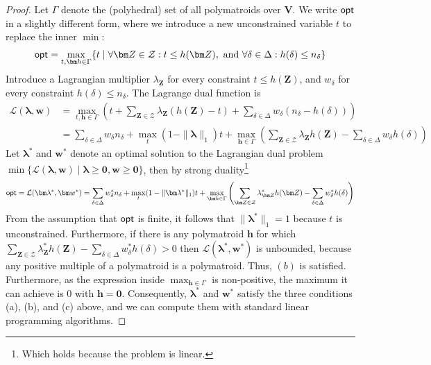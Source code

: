 \documentclass[10pt,a4paper]{article}
\newcommand{\norm}[1]{\|#1\|}
\newcommand{\opt}{\text{\sf opt}}
\newcommand{\calL}{\mathcal L}
\newcommand{\calZ}{\mathcal Z}
\begin{document}
\begin{proof}
  Let $\Gamma$ denote the (polyhedral) set of all polymatroids over $\bm V$.
  We write $\opt$ in a slightly different form, where we introduce a new unconstrained variable
  $t$ to replace the inner $\min$:
  \begin{align} \opt = \max_{t, \bm h \in \Gamma}
      \{
        t \mid
        \forall {\bm Z} \in \calZ : t \leq h({\bm Z}),
        \text{ and }
        \forall \delta \in \Delta : h(\delta) \leq n_\delta
      \}
      \label{eq:max:min:problem:lp}
  \end{align}
  Introduce a Lagrangian multiplier $\lambda_{\bm Z}$ for every constraint $t \leq h({\bm Z})$,
  and $w_\delta$ for every constraint $h(\delta) \leq n_\delta$. The Lagrange dual
  function is
  \begin{align*}
      \calL(\bm \lambda, \bm w)
      &= \max_{t, \bm h \in \Gamma}
        \left( t + \sum_{{\bm Z} \in \calZ}\lambda_{\bm Z} (h({\bm Z})-t)
        + \sum_{\delta \in \Delta} w_\delta (n_\delta-h(\delta))
        \right) \\
      &= \sum_{\delta\in\Delta}w_\delta n_\delta
      + \max_{t} (1-\norm{\bm\lambda}_1)t
      + \max_{\bm h \in \Gamma} \left(
          \sum_{{\bm Z} \in \calZ} \lambda_{\bm Z}h({\bm Z}) -
          \sum_{\delta \in \Delta} w_\delta h(\delta)
        \right)
  \end{align*}
Let $\bm \lambda^*$ and $\bm w^*$ denote an optimal solution to the Lagrangian dual
problem
$\min \{ \calL(\bm \lambda, \bm w) \mid \bm\lambda \geq \bm 0, \bm w \geq \bm 0 \}$, then
by strong duality\footnote{Which holds because the problem is linear.}
\[
  \opt = \calL(\bm\lambda^*, \bm w^*)
      = \sum_{\delta\in\Delta}w^*_\delta n_\delta
      + \max_{t} (1-\norm{\bm\lambda^*}_1)t
      + \max_{\bm h \in \Gamma} \left(
          \sum_{{\bm Z} \in \calZ} \lambda^*_{\bm Z}h({\bm Z}) - \sum_{\delta \in \Delta} w^*_\delta h(\delta)
        \right)
\]
From the assumption that $\opt$ is finite, it follows that $\norm{\bm\lambda^*}_1=1$ because $t$
is unconstrained.
Furthermore, if there is any polymatroid $\bm h$ for which
$\sum_{{\bm Z} \in \calZ} \lambda^*_{\bm Z}h({\bm Z}) - \sum_{\delta \in \Delta} w^*_\delta h(\delta)
>0$ then
$\calL(\bm\lambda^*, \bm w^*)$ is unbounded, because any positive multiple of a polymatroid
is a polymatroid.
Thus, $(b)$ is satisfied. Furthermore, as the expression inside $\max_{\bm h \in \Gamma}$
is non-positive, the maximum it can achieve is $0$ with $\bm h = \bm 0$.
Consequently, $\bm\lambda^*$ and $\bm w^*$ satisfy the three conditions (a), (b), and (c)
above, and we can compute them with standard linear programming algorithms.
\end{proof}
\end{document}
